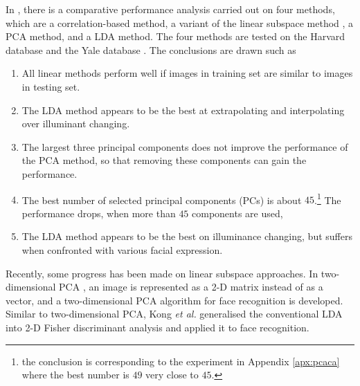 In \cite{Belhumeur1997}, there is a comparative performance analysis carried out on four methods, which are a correlation-based method, a variant of the linear subspace method \cite{Shashua1994}, a PCA method, and a LDA method. The four methods are tested on the Harvard database \cite{Hallinan1995} and the Yale database \cite{Georghiades2001}. The conclusions are drawn such as
\begin{enumerate}
 \item All linear methods perform well if images in training set are similar to images in testing set.
 \item The LDA method appears to be the best at extrapolating and interpolating over illuminant changing.
 \item The largest three principal components does not improve the performance of the PCA method, so that removing these components can gain the performance.
 \item The best number of selected principal components (PCs) is about $45$.\footnote{the conclusion is corresponding to the experiment in \mbox{Appendix} \ref{apx:pcaca} where the best number is $49$ very close to $45$.} The performance drops, when more than $45$ components are used, 
 \item The LDA method appears to be the best on illuminance changing, but suffers when confronted with various facial expression.
\end{enumerate}

Recently, some progress has been made on linear subspace approaches. In two-dimensional PCA \cite{Yang2004}, an image is represented as a 2-D matrix instead of as a vector, and a two-dimensional PCA algorithm for face recognition is developed. Similar to two-dimensional PCA, Kong \textit{et al.} \cite{Kong2005} generalised the conventional LDA into 2-D Fisher discriminant analysis and applied it to face recognition.

